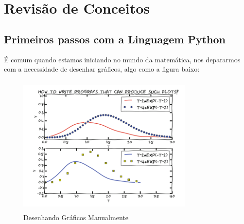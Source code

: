 







\chapter{Revisão de Conceitos}



\section{Primeiros passos com a Linguagem Python}\label{python}

É comum quando estamos iniciando no mundo da matemática, nos depararmos com a necessidade de desenhar gráficos, algo como a figura baixo:

\begin{figure}
    \includegraphics[width=250pt, height=200pt]{chapters/chapter0/figures/manual_graph.png}
    \caption[Desenhando Gráficos Manualmente]{Desenhando Gráficos Manualmente}
\end{figure}


